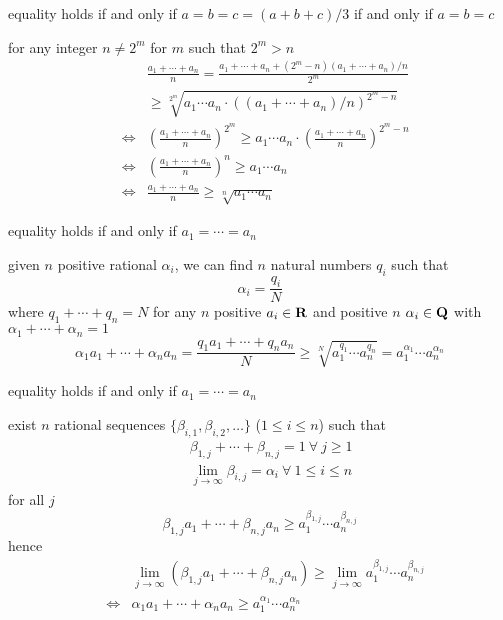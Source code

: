 \documentclass[17pt,landscape]{foils}
\begin{document}
\bit
\item equality holds if and only if $a=b=c=(a+b+c)/3$ if and only if $a=b=c$
\eit
\eit
{}
\bit
\item for any integer $n\neq 2^m$
\vitem for $m$ such that $2^m>n$
\begin{eqnarray*}
&&
\frac{a_1+\cdots+a_n}{n} = \frac{a_1 + \cdots + a_n + (2^m-n) (a_1+\cdots+a_n) /n}{2^m}
\\
&&
\geq
\sqrt[2^m]{a_1\cdots a_n \cdot ((a_1 + \cdots + a_n)/n)^{2^m-n}}
\\
&\Leftrightarrow&
\left(\frac{a_1+\cdots+a_n}{n}\right)^{2^m}
\geq
{a_1\cdots a_n \cdot \left(\frac{a_1 + \cdots + a_n}{n}\right)^{2^m-n}}
\\
&\Leftrightarrow&
\left(\frac{a_1+\cdots+a_n}{n}\right)^{n}
\geq
{a_1\cdots a_n}
\\
&\Leftrightarrow&
\frac{a_1+\cdots+a_n}{n}
\geq
\sqrt[n]{a_1\cdots a_n}
\end{eqnarray*}
\bit
\item equality holds if and only if $a_1=\cdots=a_n$
\eit
\eit
{}
\bit
\item
given $n$ positive rational $\alpha_i$,
we can find $n$ natural numbers $q_i$
such that
\[
\alpha_i = \frac{q_i}{ N}
\]
where $q_1+\cdots+q_n=N$
\vitem
for any $n$ positive $a_i\in\mbox{\bf R}$ and positive $n$ $\alpha_i\in{\ensuremath{\mbox{\bf Q}}}$ with $\alpha_1+\cdots+\alpha_n=1$
\[
\alpha_1 a_1 + \cdots + \alpha_n a_n
= \frac{q_1 a_1 + \cdots + q_n a_n}{N}
\geq \sqrt[N]{a_1^{q_1}\cdots a_n^{q_n}}
= a_1^{\alpha_1}\cdots a_n^{\alpha_n}
\]
\bit
\item
equality holds if and only if $a_1=\cdots=a_n$
\eit
\eit
{}
\bit
\item
exist $n$ rational sequences $\{ \beta_{i,1}, \beta_{i,2}, \ldots\}$ ($1\leq i\leq n$) such that
\begin{eqnarray*}
&&
\beta_{1,j}+\cdots+\beta_{n,j}=1 \ \forall \ j\geq1
\\
&&
\lim_{j\to\infty} \beta_{i,j} = \alpha_i \ \forall \ 1\leq i\leq n
\end{eqnarray*}
\vitem
for all $j$
\[
\beta_{1,j} a_1 + \cdots + \beta_{n,j} a_n
\geq
a_1^{\beta_{1,j}}\cdots a_n^{\beta_{n,j}}
\]
hence
\begin{eqnarray*}
&&
\lim_{j\to\infty} \left(\beta_{1,j} a_1 + \cdots + \beta_{n,j} a_n \right)
\geq
\lim_{j\to\infty} a_1^{\beta_{1,j}}\cdots a_n^{\beta_{n,j}}
\\
&\Leftrightarrow&
\alpha_1 a_1 + \cdots + \alpha_n a_n
\geq
a_1^{\alpha_1}\cdots a_n^{\alpha_n}
\end{eqnarray*}
\end{document}
